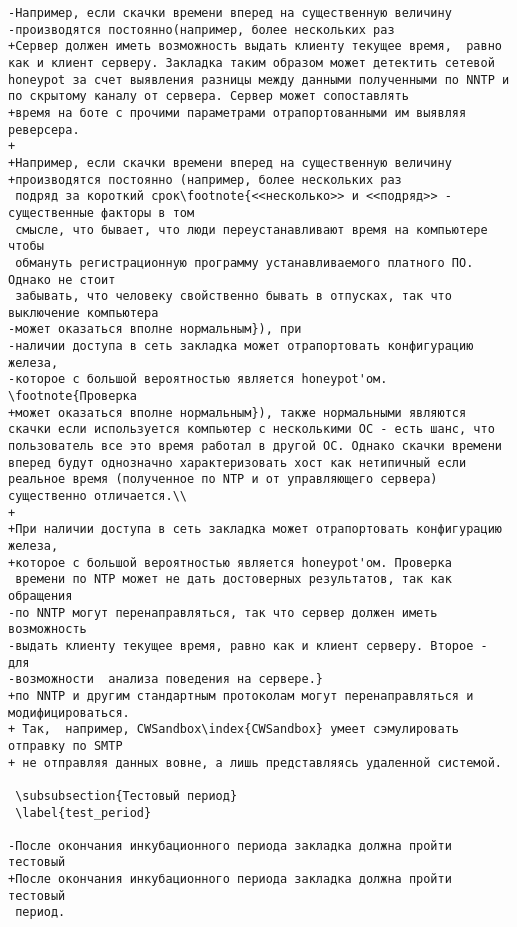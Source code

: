\begin{verbatim}
-Например, если скачки времени вперед на существенную величину
-производятся постоянно(например, более нескольких раз
+Сервер должен иметь возможность выдать клиенту текущее время,  равно как и клиент серверу. Закладка таким образом может детектить сетевой honeypot за счет выявления разницы между данными полученными по NNTP и по скрытому каналу от сервера. Сервер может сопоставлять
+время на боте с прочими параметрами отрапортованными им выявляя реверсера.
+
+Например, если скачки времени вперед на существенную величину
+производятся постоянно (например, более нескольких раз
 подряд за короткий срок\footnote{<<несколько>> и <<подряд>> - существенные факторы в том
 смысле, что бывает, что люди переустанавливают время на компьютере чтобы
 обмануть регистрационную программу устанавливаемого платного ПО. Однако не стоит
 забывать, что человеку свойственно бывать в отпусках, так что выключение компьютера
-может оказаться вполне нормальным}), при
-наличии доступа в сеть закладка может отрапортовать конфигурацию железа,
-которое с большой вероятностью является honeypot'ом. \footnote{Проверка
+может оказаться вполне нормальным}), также нормальными являются скачки если используется компьютер с несколькими ОС - есть шанс, что пользователь все это время работал в другой ОС. Однако скачки времени вперед будут однозначно характеризовать хост как нетипичный если реальное время (полученное по NTP и от управляющего сервера) существенно отличается.\\
+
+При наличии доступа в сеть закладка может отрапортовать конфигурацию железа,
+которое с большой вероятностью является honeypot'ом. Проверка
 времени по NTP может не дать достоверных результатов, так как обращения
-по NNTP могут перенаправляться, так что сервер должен иметь возможность
-выдать клиенту текущее время, равно как и клиент серверу. Второе - для
-возможности  анализа поведения на сервере.}
+по NNTP и другим стандартным протоколам могут перенаправляться и модифицироваться.
+ Так,  например, CWSandbox\index{CWSandbox} умеет сэмулировать отправку по SMTP
+ не отправляя данных вовне, а лишь представляясь удаленной системой.

 \subsubsection{Тестовый период}
 \label{test_period}

-После окончания инкубационного периода закладка должна пройти тестовый
+После окончания инкубационного периода закладка должна пройти тестовый
 период.


\end{verbatim}

